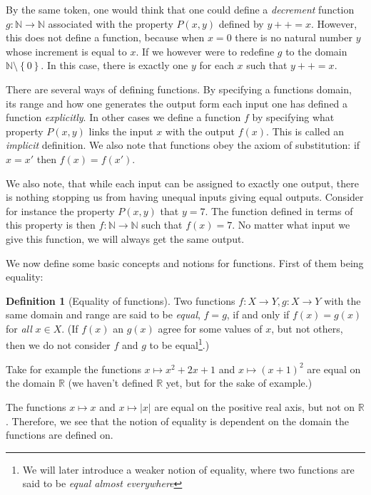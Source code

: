 \documentclass[a4paper, twocolumn]{report}
\newcounter{dummy} \numberwithin{dummy}{section}
\theoremstyle{definition}
\newtheorem{defn}[dummy]{Definition}
\theoremstyle{solution}
\newcommand{\dplus}{{+}{+}} %
\begin{document}
By the same token, one would think that one could define a \textit{decrement}
function $g : \mathbb{N} \rightarrow \mathbb{N}$ associated with the property
$P(x, y)$ defined by $y \dplus = x$. However, this does not define a function,
because when $x = 0$ there is no natural number $y$ whose increment is equal to
$x$.  If we however were to redefine $g$ to the domain $\mathbb{N} \setminus
\left\{ 0 \right\}$.  In this case, there is exactly one $y$ for each $x$ such
that $y++ = x$. 


There are several ways of defining functions. By specifying a functions domain,
its range and how one generates the output form each input one has defined a
function \textit{explicitly}. In other cases we define a function $f$ by
specifying what property $P(x, y)$ links the input $x$ with the output $f(x)$.
This is called an \textit{implicit} definition.
We also note that functions obey the axiom of substitution: if $x = x'$ then
$f(x) = f(x')$.

We also note, that while each input can be assigned to exactly one output,
there is nothing stopping us from having unequal inputs giving equal outputs.
Consider for instance the property $P(x, y)$ that $y = 7$. The function defined
in terms of this property is then $f : \mathbb{N} \rightarrow \mathbb{N}$ such
that $f(x) = 7$. No matter what input we give this function, we will always get
the same output.

We now define some basic concepts and notions for functions. First of them being equality:

\begin{defn}[Equality of functions]
  \label{defn_337}
  Two functions $f : X \rightarrow Y, g : X \rightarrow Y$ with the same domain
  and range are said to be \textit{equal}, $f = g$, if and only if $f(x) =
  g(x)$ for \textit{all} $x \in X$. (If $f(x)$ an $g(x)$ agree for some values
    of $x$, but not others, then we do not consider $f$ and $g$ to be
    equal\footnote{We will later introduce a weaker notion of equality, where
  two functions are said to be \textit{equal almost everywhere}}.)
\end{defn}
\addtocounter{dummy}{2}

Take for example the functions $x \mapsto x^{2} + 2x + 1$ and $x \mapsto
(x+1)^{2}$ are equal on the domain $\mathbb{R}$ (we haven't defined
$\mathbb{R}$ yet, but for the sake of example.)

The functions $x \mapsto x$ and $x \mapsto |x|$ are equal on the positive real
axis, but not on $\mathbb{R}$. Therefore, we see that the notion of equality is
dependent on the domain the functions are defined on.
\end{document}
